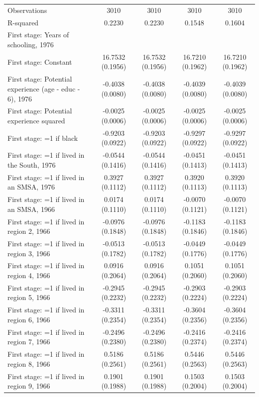 \begin{table}
\begin{tabular}{lcccc}
Observations & 3010 & 3010 & 3010 & 3010 \\
R-squared & 0.2230 & 0.2230 & 0.1548 & 0.1604 \\
First stage: Years of schooling, 1976 &  &  &  &  \\
First stage: Constant & 16.7532 (0.1956) & 16.7532 (0.1956) & 16.7210 (0.1962) & 16.7210 (0.1962) \\
First stage: Potential experience (age - educ - 6), 1976 & -0.4038 (0.0080) & -0.4038 (0.0080) & -0.4039 (0.0080) & -0.4039 (0.0080) \\
First stage: Potential experience squared & -0.0025 (0.0006) & -0.0025 (0.0006) & -0.0025 (0.0006) & -0.0025 (0.0006) \\
First stage: =1 if black & -0.9203 (0.0922) & -0.9203 (0.0922) & -0.9297 (0.0922) & -0.9297 (0.0922) \\
First stage: =1 if lived in the South, 1976 & -0.0544 (0.1416) & -0.0544 (0.1416) & -0.0451 (0.1413) & -0.0451 (0.1413) \\
First stage: =1 if lived in an SMSA, 1976 & 0.3927 (0.1112) & 0.3927 (0.1112) & 0.3920 (0.1113) & 0.3920 (0.1113) \\
First stage: =1 if lived in an SMSA, 1966 & 0.0174 (0.1110) & 0.0174 (0.1110) & -0.0070 (0.1121) & -0.0070 (0.1121) \\
First stage: =1 if lived in region 2, 1966 & -0.0976 (0.1848) & -0.0976 (0.1848) & -0.1183 (0.1846) & -0.1183 (0.1846) \\
First stage: =1 if lived in region 3, 1966 & -0.0513 (0.1782) & -0.0513 (0.1782) & -0.0449 (0.1776) & -0.0449 (0.1776) \\
First stage: =1 if lived in region 4, 1966 & 0.0916 (0.2064) & 0.0916 (0.2064) & 0.1051 (0.2060) & 0.1051 (0.2060) \\
First stage: =1 if lived in region 5, 1966 & -0.2945 (0.2232) & -0.2945 (0.2232) & -0.2903 (0.2224) & -0.2903 (0.2224) \\
First stage: =1 if lived in region 6, 1966 & -0.3311 (0.2354) & -0.3311 (0.2354) & -0.3604 (0.2356) & -0.3604 (0.2356) \\
First stage: =1 if lived in region 7, 1966 & -0.2496 (0.2380) & -0.2496 (0.2380) & -0.2416 (0.2374) & -0.2416 (0.2374) \\
First stage: =1 if lived in region 8, 1966 & 0.5186 (0.2561) & 0.5186 (0.2561) & 0.5446 (0.2563) & 0.5446 (0.2563) \\
First stage: =1 if lived in region 9, 1966 & 0.1901 (0.1988) & 0.1901 (0.1988) & 0.1503 (0.2004) & 0.1503 (0.2004) \\

\end{tabular}
\end{table}

